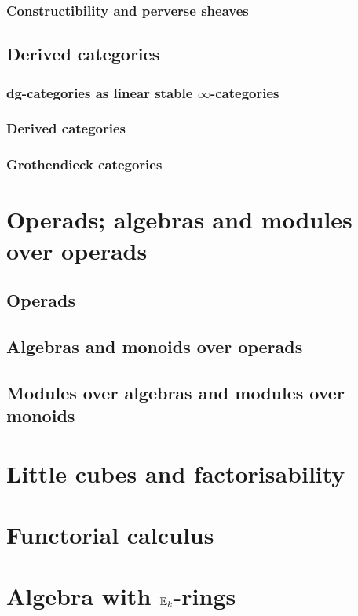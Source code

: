             \subsubsection{Constructibility and perverse sheaves}
            
        \subsection{Derived categories}
            \subsubsection{dg-categories as linear stable \texorpdfstring{$\infty$}{}-categories}
            
            \subsubsection{Derived categories}
            
            \subsubsection{Grothendieck categories}
    
    \section{Operads; algebras and modules over operads} \label{section: algebras_and_modules_over_operads}
        \subsection{Operads} \label{subsection: operads}
        
        \subsection{Algebras and monoids over operads}
        
        \subsection{Modules over algebras and modules over monoids}
    
    \section{Little cubes and factorisability}
    
    \section{Functorial calculus}
    
    \section{Algebra with \texorpdfstring{$\mathbb{E}_k$}{}-rings}
